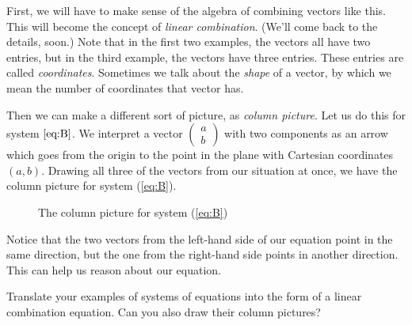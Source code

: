 \documentclass[elementsmain.tex]{subfiles}
\begin{document}
First, we will have to make sense of the algebra of combining vectors like this. This will become the concept of \emph{linear combination}. (We'll come back to the details, soon.) Note that in the first two examples, the vectors all have two entries, but in the third example, the vectors have three entries. These entries are called \emph{coordinates}. Sometimes we talk about the \emph{shape} of a vector, by which we mean the number of coordinates that vector has.

Then we can make a different sort of picture, as \emph{column picture}. Let us do this for system $\ref{eq:B}$. We interpret a vector $\left(\begin{smallmatrix}a \\ b\end{smallmatrix}\right)$ with two components as an arrow which goes from the origin to the point in the plane with Cartesian coordinates $(a,b)$. Drawing all three of the vectors from our situation at once, we have the column picture for system (\ref{eq:B}).
\begin{figure}[h!]
\centering
{}
\caption{The column picture for system (\ref{eq:B})}
\label{fig:colpic-A}
\end{figure}

Notice that the two vectors from the left-hand side of our equation point in the same direction, but the one from the right-hand side points in another direction. This can help us reason about our equation.

\begin{readingex} Translate your examples of systems of equations into the form of a
linear combination equation. Can you also draw their column pictures?
\end{readingex}
\end{document}
